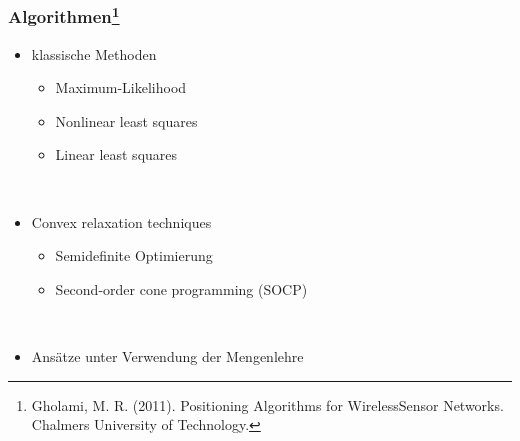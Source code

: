 \begin{frame}
  \frametitle{Algorithmen\footnote{Gholami, M. R. (2011). Positioning Algorithms for
      WirelessSensor Networks. Chalmers University of Technology.}}

  \begin{itemize}
  \item klassische Methoden
    \begin{itemize}
    \item Maximum-Likelihood
    \item Nonlinear least squares
    \item Linear least squares
    \end{itemize}
  ~\\
  \item Convex relaxation techniques
    \begin{itemize}
    \item Semidefinite Optimierung
    \item Second-order cone programming (SOCP)
    \end{itemize}
  ~\\
  \item Ansätze unter Verwendung der Mengenlehre
  \end{itemize}
\end{frame}
